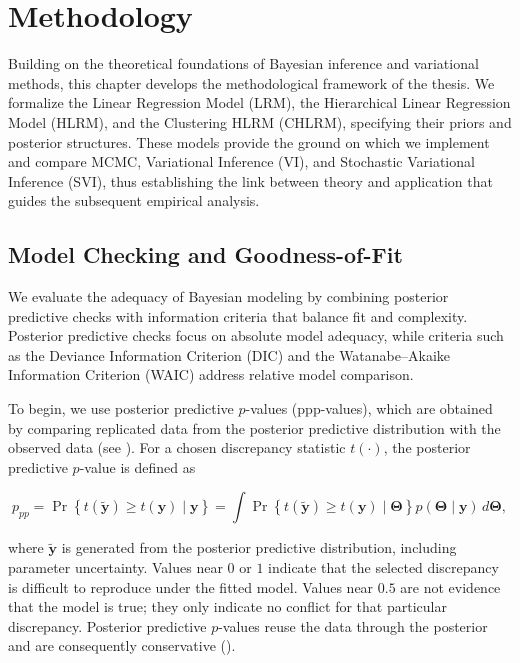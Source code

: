 \chapter{Methodology}

Building on the theoretical foundations of Bayesian inference and variational methods, this chapter develops the methodological framework of the thesis. We formalize the Linear Regression Model (LRM), the Hierarchical Linear Regression Model (HLRM), and the Clustering HLRM (CHLRM), specifying their priors and posterior structures. These models provide the ground on which we implement and compare MCMC, Variational Inference (VI), and Stochastic Variational Inference (SVI), thus establishing the link between theory and application that guides the subsequent empirical analysis.

\section{Model Checking and Goodness-of-Fit}

We evaluate the adequacy of Bayesian modeling by combining posterior predictive checks with information criteria that balance fit and complexity. Posterior predictive checks focus on absolute model adequacy, while criteria such as the Deviance Information Criterion (DIC) and the Watanabe--Akaike Information Criterion (WAIC) address relative model comparison.

\vspace{0.5cm}

To begin, we use posterior predictive $p$-values (ppp-values), which are obtained by comparing replicated data from the posterior predictive distribution with the observed data (see  \cite{GELMAN14}). For a chosen discrepancy statistic $t(\cdot)$, the posterior predictive $p$-value is defined as

\begin{equation}
p_{pp} = \Pr\left\{t(\bm{\tilde{y}}) \geq t(\bm y)\mid \bm y\right\}
=\int \Pr\left\{t(\bm{\tilde{y}})\geq t(\bm y)\mid\bm\Theta\right\}
p(\bm\Theta\mid\bm y)\,d\bm\Theta,
\end{equation}

where $\bm{\tilde y}$ is generated from the posterior predictive distribution, including parameter uncertainty. Values near $0$ or $1$ indicate that the selected discrepancy is difficult to reproduce under the fitted model. Values near $0.5$ are not evidence that the model is true; they only indicate no conflict for that particular discrepancy. Posterior predictive $p$-values reuse the data through the posterior and are consequently conservative (\cite{GELMAN14}).


